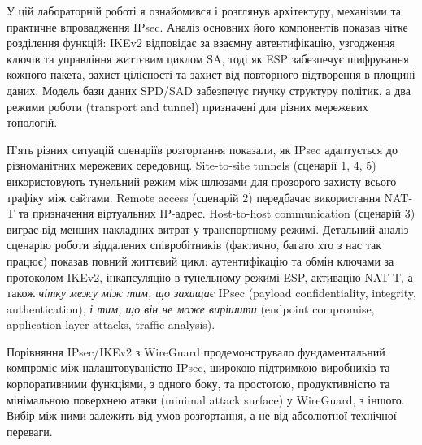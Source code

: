 У цій лабораторній роботі я ознайомився і розглянув архітектуру, механізми та практичне впровадження IPsec. Аналіз 
основних його компонентів показав чітке розділення функцій: IKEv2 відповідає за взаємну автентифікацію, 
узгодження ключів та управління життєвим циклом SA, тоді як ESP забезпечує шифрування кожного пакета, захист цілісності 
та захист від повторного відтворення в площині даних. Модель бази даних SPD/SAD забезпечує гнучку структуру політик, 
а два режими роботи (transport and tunnel) призначені для різних мережевих топологій.

П’ять різних ситуацій сценаріїв розгортання показали, як IPsec адаптується до різноманітних мережевих середовищ. 
Site-to-site tunnels (сценарії 1, 4, 5) використовують тунельний режим між шлюзами для прозорого захисту 
всього трафіку між сайтами. Remote access (сценарій 2) передбачає використання NAT-T та призначення віртуальних 
IP-адрес. Host-to-host communication (сценарій 3) виграє від менших накладних витрат у транспортному режимі. 
Детальний аналіз сценарію роботи віддалених співробітників (фактично, багато хто з нас так працює) показав повний 
життєвий цикл: аутентифікацію та обмін ключами за протоколом IKEv2, інкапсуляцію в тунельному режимі ESP, активацію 
NAT-T, а також \textit{чітку межу між тим, що захищає} IPsec (payload confidentiality, integrity, authentication), 
\textit{і тим, що він не може вирішити} (endpoint compromise, application-layer attacks, traffic analysis).

Порівняння IPsec/IKEv2 з WireGuard продемонструвало фундаментальний компроміс між налаштовуваністю IPsec, 
широкою підтримкою виробників та корпоративними функціями, з одного боку, та простотою, продуктивністю та 
мінімальною поверхнею атаки (minimal attack surface) у WireGuard, з іншого. Вибір між ними залежить від умов 
розгортання, а не від абсолютної технічної переваги.
